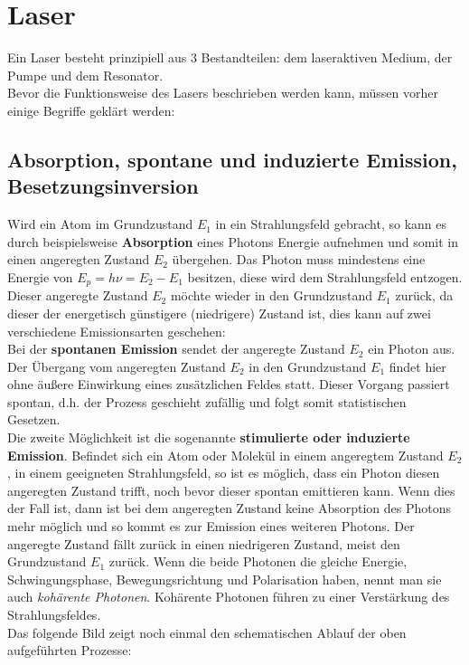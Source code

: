 \section{Laser}
Ein Laser besteht prinzipiell aus 3 Bestandteilen: dem laseraktiven Medium, der Pumpe und dem Resonator.\\
Bevor die Funktionsweise des Lasers beschrieben werden kann, müssen vorher einige Begriffe geklärt werden:
\subsection{Absorption, spontane und induzierte Emission, Besetzungsinversion}
Wird ein Atom im Grundzustand $E_1$ in ein Strahlungsfeld gebracht, so kann es durch beispielsweise \textbf{Absorption} 
eines Photons Energie aufnehmen und somit in einen angeregten Zustand $E_2$ übergehen. Das Photon muss mindestens eine 
Energie von $E_p = h \nu = E_2 - E_1$ besitzen, diese wird dem Strahlungsfeld entzogen.\\
Dieser angeregte Zustand $E_2$ möchte wieder in den Grundzustand $E_1$ zurück, da dieser der energetisch günstigere (niedrigere) Zustand ist, dies kann auf zwei verschiedene Emissionsarten geschehen:\\
Bei der \textbf{spontanen Emission} sendet der angeregte Zustand $E_2$  ein Photon aus. Der Übergang vom angeregten Zustand $E_2$ in den Grundzustand $E_1$ findet hier ohne äußere Einwirkung eines zusätzlichen Feldes statt. Dieser Vorgang passiert spontan, d.h. der Prozess geschieht zufällig und folgt somit statistischen Gesetzen. \\
Die zweite Möglichkeit ist die sogenannte \textbf{stimulierte oder induzierte Emission}. 
Befindet sich ein Atom oder Molekül in einem angeregtem Zustand $E_2$, in einem geeigneten Strahlungsfeld, so ist 
es möglich, dass ein Photon diesen angeregten Zustand trifft, noch bevor dieser spontan emittieren kann. 
Wenn dies der Fall ist, dann ist bei dem angeregten Zustand keine Absorption des Photons mehr möglich und 
so kommt es zur Emission eines weiteren Photons. Der angeregte Zustand fällt zurück in einen 
niedrigeren Zustand, meist den Grundzustand $E_1$ zurück. 
Wenn die beide Photonen die gleiche Energie, Schwingungsphase, Bewegungsrichtung und Polarisation haben,
nennt man sie auch \textit{kohärente Photonen}. Kohärente Photonen führen zu einer Verstärkung des 
Strahlungsfeldes. \\
Das folgende Bild zeigt noch einmal den schematischen Ablauf der oben aufgeführten Prozesse:
